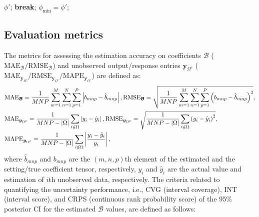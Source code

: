\documentclass[12pt]{article}
\newcommand{\given}{\;\middle|\;}
\begin{document}
\begin{algorithm}[!ht]
{\uIf{$\exp{\big(\log{p\left(\phi'\given\boldsymbol{y}_{\Omega},\boldsymbol{V},\boldsymbol{W},\tau,\boldsymbol{\mathcal{X}}\right)}-\log{p\left(\phi\given\boldsymbol{y}_{\Omega},\boldsymbol{V},\boldsymbol{W},\tau,\boldsymbol{\mathcal{X}}\right)}\big)}>\eta$}
{\Return $\phi'$; \textbf{break};}
    {$\phi_{\min}=\phi'$;}
}
\end{algorithm}



\subsection{Evaluation metrics}\label{appC}

The metrics for assessing the estimation accuracy on coefficients $\boldsymbol{\mathcal{B}}$ ($\text{MAE}_{\boldsymbol{\mathcal{B}}}/\text{RMSE}_{\boldsymbol{\mathcal{B}}}$) and unobserved output/response entries $\boldsymbol{y}_{\Omega^c}$ ($\text{MAE}_{\boldsymbol{y}_{\Omega^c}}/\text{RMSE}_{\boldsymbol{y}_{\Omega^c}}/\text{MAPE}_{\boldsymbol{y}_{\Omega^c}}$) are defined as:
\begin{equation*}
\begin{aligned}
\footnotesize
&\text{MAE}_{\boldsymbol{\mathcal{B}}}=\frac{1}{MNP}\sum_{m=1}^{M}\sum_{n=1}^{N}\sum_{p=1}^{P}\left|b_{mnp}-\hat{b}_{mnp}\right|, \text{RMSE}_{\boldsymbol{\mathcal{B}}}=\sqrt{\frac{1}{MNP}\sum_{m=1}^{M}\sum_{n=1}^{N}\sum_{p=1}^{P}\left(b_{mnp}-\hat{b}_{mnp}\right)^2}, \\
&\text{MAE}_{\boldsymbol{y}_{\Omega^c}}=\frac{1}{MNP-|\Omega|}\sum_{i\notin\Omega}\left|y_{i}-\hat{y}_{i}\right|, \text{RMSE}_{\boldsymbol{y}_{\Omega^c}}=\sqrt{\frac{1}{MNP-|\Omega|}\sum_{i\notin\Omega}\left(y_{i}-\hat{y}_{i}\right)^2}, \\
&\text{MAPE}_{\boldsymbol{y}_{\Omega^c}}=\frac{1}{MNP-|\Omega|}\sum_{i\notin\Omega}\left|\frac{y_{i}-\hat{y}_{i}}{y_{i}}\right|,
\end{aligned}
\end{equation*}
where $\hat{b}_{mnp}$ and $b_{mnp}$ are the $(m,n,p)$th element of the estimated and the setting/true coefficient tensor, respectively, $y_{i}$ and $\hat{y}_{i}$ are the actual value and estimation of $i$th unobserved data, respectively. The criteria related to quantifying the uncertainty performance, i.e., CVG (interval coverage), INT (interval score), and CRPS (continuous rank probability score) of the 95\% posterior CI for the estimated $\boldsymbol{\mathcal{B}}$ values, are defined as follows:
\end{document}
